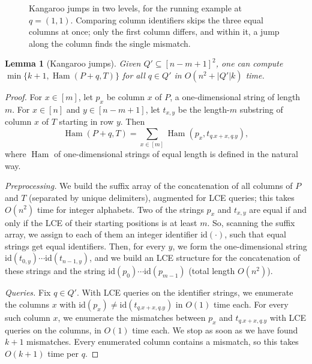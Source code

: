 \documentclass[11pt]{article}
\newtheorem{lemma}[theorem]{Lemma}
\theoremstyle{definition}
\renewcommand{\O}{O}
\DeclareMathOperator{\Ham}{Ham}
\newcommand{\abs}[1]{\lvert #1 \rvert}
\newcommand{\x}[1]{#1.x}
\newcommand{\y}[1]{#1.y}
\newcommand{\chargrid}[3]{%
  \foreach \row [count=\r] in {#3} {
    \foreach \ch [count=\c] in \row {
      \node[cell] at ({#1+(\c-1)*0.46}, {#2-(\r-1)*0.46}) {\ch};
    }
  }%
}
\begin{document}
\begin{figure}[t]
  \centering
  \caption{Kangaroo jumps in two levels, for the running example at $q = (1,1)$.
    Comparing column identifiers skips the three equal columns at once; only the first column differs, and within it, a jump along the column finds the single mismatch.}
  \label{fig:kangaroo}
\end{figure}

\begin{lemma}[Kangaroo jumps]\label{lem:kangaroo}
Given $Q' \subseteq [n-m+1]^2$, one can compute $\min\{k+1, \Ham(P+q, T)\}$ for all $q \in Q'$ in $\O(n^2 + \abs{Q'} k)$ time.
\end{lemma}
\begin{proof}
For $x \in [m]$, let $p_x$ be column $x$ of $P$, a one-dimensional string of length $m$.
For $x \in [n]$ and $y \in [n-m+1]$, let $t_{x,y}$ be the length-$m$ substring of column $x$ of $T$ starting in row $y$.
Then
\[ \Ham(P+q, T) = \textstyle\sum_{x \in [m]} \Ham(p_x, t_{\x{q}+x, \y{q}}), \]
where $\Ham$ of one-dimensional strings of equal length is defined in the natural way.

\emph{Preprocessing.}
We build the suffix array of the concatenation of all columns of $P$ and $T$ (separated by unique delimiters), augmented for LCE queries; this takes $\O(n^2)$ time for integer alphabets.
Two of the strings $p_x$ and $t_{x,y}$ are equal if and only if the LCE of their starting positions is at least $m$.
So, scanning the suffix array, we assign to each of them an integer identifier $\mathrm{id}(\cdot)$, such that equal strings get equal identifiers.
Then, for every $y$, we form the one-dimensional string $\mathrm{id}(t_{0,y}) \cdots \mathrm{id}(t_{n-1,y})$, and we build an LCE structure for the concatenation of these strings and the string $\mathrm{id}(p_0) \cdots \mathrm{id}(p_{m-1})$ (total length $\O(n^2)$).

\emph{Queries.}
Fix $q \in Q'$.
With LCE queries on the identifier strings, we enumerate the columns $x$ with $\mathrm{id}(p_x) \neq \mathrm{id}(t_{\x{q}+x,\y{q}})$ in $\O(1)$ time each.
For every such column $x$, we enumerate the mismatches between $p_x$ and $t_{\x{q}+x,\y{q}}$ with LCE queries on the columns, in $\O(1)$ time each.
We stop as soon as we have found $k+1$ mismatches.
Every enumerated column contains a mismatch, so this takes $\O(k + 1)$ time per $q$.
\end{proof}
\end{document}
